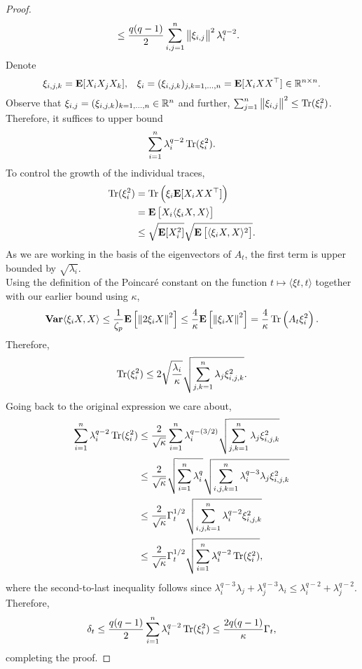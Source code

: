 \documentclass{article}
\begin{document}
\begin{proof}
\begin{align*}
					&\leq \frac{q(q-1)}{2} \sum_{i,j = 1}^n \left\lVert\xi_{i,j}\right\rVert^2 \lambda_i^{q-2}.
			\end{align*}
			Denote
			\[ \xi_{i,j,k} = \textbf{E}[X_i X_j X_k], \;\;\; \xi_{i} = (\xi_{i,j,k})_{j,k=1,\ldots,n} = \textbf{E}[X_i X X^\top] \in \mathbb{R}^{n\times n}. \]
			Observe that $\xi_{i,j} = (\xi_{i,j,k})_{k = 1,\ldots,n} \in \mathbb{R}^n$ and further, $\sum_{j=1}^n\left\lVert\xi_{i,j}\right\rVert^2 \leq \operatorname{Tr}(\xi_i^2)$. Therefore, it suffices to upper bound
			\[ \sum_{i=1}^n \lambda_i^{q-2} \operatorname{Tr}(\xi_i^2). \]
			To control the growth of the individual traces,
			\begin{align*}
				\operatorname{Tr}(\xi_i^2) &= \operatorname{Tr} \left(\xi_i \textbf{E}[ X_i X X^\top ] \right) \\
					&= \textbf{E}\left[ X_i \langle \xi_i X , X \rangle \right] \\
					&\leq \sqrt{\textbf{E}[X_i^2]} \sqrt{\textbf{E}\left[ \langle \xi_i X , X \rangle^2 \right]}.
			\end{align*}
			As we are working in the basis of the eigenvectors of $A_t$, the first term is upper bounded by $\sqrt{\lambda_i}$.\\
			Using the definition of the Poincar\'{e} constant on the function $t \mapsto \langle \xi t , t \rangle$ together with our earlier bound using $\kappa$,
			\[ \operatorname{\textbf{Var}} \langle \xi_i X, X \rangle \leq \frac{1}{\zeta_p} \textbf{E}\left[ \left\lVert 2 \xi_i X \right\rVert^2 \right] \leq \frac{4}{\kappa} \textbf{E}\left[ \left\lVert \xi_i X \right\rVert^2 \right] = \frac{4}{\kappa} \operatorname{Tr}\left(A_t \xi_i^2\right).  \]
			Therefore,
			\[ \operatorname{Tr}(\xi_i^2) \leq 2 \sqrt{\frac{\lambda_i}{\kappa}} \sqrt{ \sum_{j,k=1}^n \lambda_j \xi_{i,j,k}^2 }. \]
			Going back to the original expression we care about,
			\begin{align*}
				\sum_{i=1}^n \lambda_i^{q-2} \operatorname{Tr}(\xi_i^2) &\leq \frac{2}{\sqrt{\kappa}} \sum_{i=1}^n \lambda_i^{q-(3/2)} \sqrt{ \sum_{j,k=1}^n \lambda_j \xi_{i,j,k}^2 } \\
					&\leq \frac{2}{\sqrt{\kappa}} \sqrt{ \sum_{i=1}^n \lambda_i^q } \sqrt{ \sum_{i,j,k=1}^n \lambda_i^{q-3} \lambda_j \xi_{i,j,k}^2 } \\
					&\leq \frac{2}{\sqrt{\kappa}} \Gamma_t^{1/2} \sqrt{ \sum_{i,j,k=1}^n \lambda_i^{q-2} \xi_{i,j,k}^2 } \\
					&\leq \frac{2}{\sqrt{\kappa}} \Gamma_t^{1/2} \sqrt{ \sum_{i=1}^n \lambda_i^{q-2} \operatorname{Tr}(\xi_i^2) },
			\end{align*}
			where the second-to-last inequality follows since $\lambda_i^{q-3}\lambda_j + \lambda_j^{q-3}\lambda_i \leq \lambda_i^{q-2} + \lambda_j^{q-2}$.
			Therefore,
			\[ \delta_t \leq \frac{q(q-1)}{2} \sum_{i=1}^n \lambda_i^{q-2} \operatorname{Tr}(\xi_i^2) \leq \frac{2q(q-1)}{\kappa} \Gamma_t, \]
			completing the proof.
		\end{proof}
\end{document}

